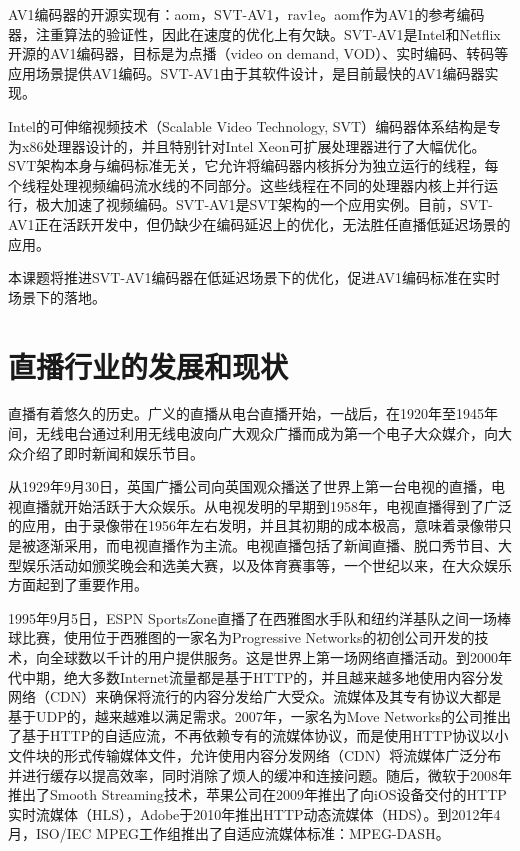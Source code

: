 AV1编码器的开源实现有：aom\cite{AV1SourceCode2020}，SVT-AV1\cite{ScalableVideoTechnology2020}，rav1e\cite{Rav1eGitRepository2020}。aom作为AV1的参考编码器，注重算法的验证性，因此在速度的优化上有欠缺。SVT-AV1是Intel和Netflix开源的AV1编码器，目标是为点播（video on demand, VOD）、实时编码、转码等应用场景提供AV1编码。SVT-AV1由于其软件设计，是目前最快的AV1编码器实现。

Intel的可伸缩视频技术（Scalable Video Technology, SVT）\cite{ScalableVideoTechnology2019}编码器体系结构是专为x86处理器设计的，并且特别针对Intel Xeon可扩展处理器进行了大幅优化。SVT架构本身与编码标准无关，它允许将编码器内核拆分为独立运行的线程，每个线程处理视频编码流水线的不同部分。这些线程在不同的处理器内核上并行运行，极大加速了视频编码。SVT-AV1是SVT架构的一个应用实例。目前，SVT-AV1正在活跃开发中，但仍缺少在编码延迟上的优化，无法胜任直播低延迟场景的应用。

本课题将推进SVT-AV1编码器在低延迟场景下的优化，促进AV1编码标准在实时场景下的落地。

\section{直播行业的发展和现状}

直播有着悠久的历史。广义的直播从电台直播开始，一战后，在1920年至1945年间，无线电台通过利用无线电波向广大观众广播而成为第一个电子大众媒介，向大众介绍了即时新闻和娱乐节目。

从1929年9月30日，英国广播公司向英国观众播送了世界上第一台电视的直播，电视直播就开始活跃于大众娱乐。从电视发明的早期到1958年，电视直播得到了广泛的应用，由于录像带在1956年左右发明，并且其初期的成本极高，意味着录像带只是被逐渐采用，而电视直播作为主流。电视直播包括了新闻直播、脱口秀节目、大型娱乐活动如颁奖晚会和选美大赛，以及体育赛事等，一个世纪以来，在大众娱乐方面起到了重要作用。

1995年9月5日，ESPN SportsZone直播了在西雅图水手队和纽约洋基队之间一场棒球比赛，使用位于西雅图的一家名为Progressive Networks的初创公司开发的技术，向全球数以千计的用户提供服务。这是世界上第一场网络直播活动。到2000年代中期，绝大多数Internet流量都是基于HTTP的，并且越来越多地使用内容分发网络（CDN）来确保将流行的内容分发给广大受众。流媒体及其专有协议大都是基于UDP的，越来越难以满足需求。2007年，一家名为Move Networks的公司推出了基于HTTP的自适应流，不再依赖专有的流媒体协议，而是使用HTTP协议以小文件块的形式传输媒体文件，允许使用内容分发网络（CDN）将流媒体广泛分布并进行缓存以提高效率，同时消除了烦人的缓冲和连接问题。随后，微软于2008年推出了Smooth Streaming技术，苹果公司在2009年推出了向iOS设备交付的HTTP实时流媒体（HLS），Adobe于2010年推出HTTP动态流媒体（HDS）。到2012年4月，ISO/IEC MPEG工作组推出了自适应流媒体标准：MPEG-DASH。

